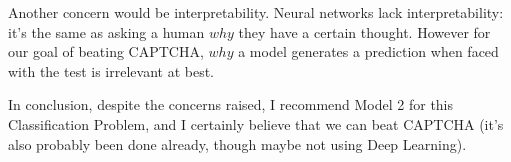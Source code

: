 \documentclass[landscape,final,a0paper]{baposter}
\begin{document}
\begin{poster}
{Another concern would be interpretability. Neural networks lack interpretability: it's the same as asking a human $why$ they have a certain thought. However for our goal of beating CAPTCHA, $why$ a model generates a prediction when faced with the test is irrelevant at best.

In conclusion, despite the concerns raised, I recommend Model 2 for this Classification Problem, and I certainly believe that we can beat CAPTCHA (it’s also probably been done already, though maybe not using Deep Learning).
}




















\end{poster}
\end{document}
